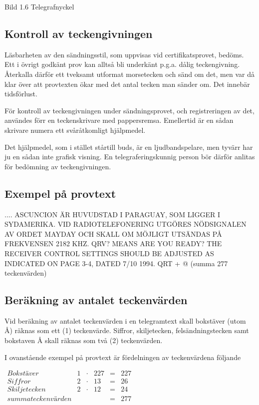 \documentclass[a4paper,twoside,twocolumn,openright]{book}
\begin{document}
Bild 1.6 Telegrafnyckel

\subsection{Kontroll av teckengivningen}

Läsbarheten av den sändningsstil, som uppvisas vid certifikatsprovet, bedöms. Ett i
övrigt godkänt prov kan alltså bli underkänt p.g.a. dålig teckengivning. Återkalla därför
ett tveksamt utformat morsetecken och sänd om det, men var då klar över att provtexten
ökar med det antal tecken man sänder om. Det innebär tidsförlust.

För kontroll av teckengivningen under sändningsprovet, och registreringen av det,
användes förr en teckenskrivare med pappersremsa. Emellertid är en sådan skrivare
numera ett svåråtkomligt hjälpmedel.

Det hjälpmedel, som i stället stårtill buds, är en ljudbandspelare, men tyvärr har ju en
sådan inte grafisk visning. En telegraferingskunnig person bör därför anlitas för
bedömning av teckengivningen.

\subsection{Exempel på provtext}

.... ASCUNCION ÄR HUVUDSTAD I PARAGUAY, SOM LIGGER I SYDAMERIKA.
VID RADIOTELEFONERING UTGÖRES NÖDSIGNALEN AV ORDET MAYDAY
OCH SKALL OM MÖJLIGT UTSÄNDAS PÅ FREKVENSEN 2182 KHZ. QRV? MEANS
ARE YOU READY? THE RECEIVER CONTROL SETTINGS SHOULD BE
ADJUSTED AS INDICATED ON PAGE 3-4,
DATED 7/10 1994. QRT + @
(summa 277 teckenvärden)

\subsection{Beräkning av antalet teckenvärden}

Vid beräkning av antalet teckenvärden i en telegramtext skall bokstäver (utom Å) räknas
som ett (1) teckenvärde. Siffror, skiljetecken, felsändningstecken samt bokstaven
Å skall räknas som två (2) teckenvärden.

I ovanstående exempel på provtext är
fördelningen av teckenvärdena följande

$\begin{array}{lccrcr}
Bokstäver & 1 & \cdot & 227 & = & 227 \\
Siffror & 2 & \cdot & 13 & = & 26 \\
Skiljetecken & 2 & \cdot & 12 & = & 24 \\
summa teckenvärden & & & & = & 277
\end{array}
$
\end{document}
